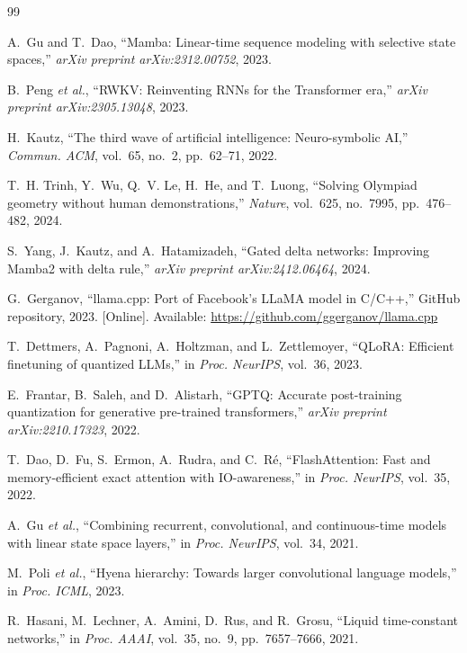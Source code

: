 \documentclass[journal]{IEEEtran}
\begin{document}
\begin{thebibliography}{99}

A.~Gu and T.~Dao, ``Mamba: Linear-time sequence modeling with selective state spaces,'' \textit{arXiv preprint arXiv:2312.00752}, 2023.

B.~Peng \textit{et al.}, ``RWKV: Reinventing RNNs for the Transformer era,'' \textit{arXiv preprint arXiv:2305.13048}, 2023.

H.~Kautz, ``The third wave of artificial intelligence: Neuro-symbolic AI,'' \textit{Commun. ACM}, vol.~65, no.~2, pp.~62--71, 2022.

T.~H. Trinh, Y.~Wu, Q.~V. Le, H.~He, and T.~Luong, ``Solving Olympiad geometry without human demonstrations,'' \textit{Nature}, vol.~625, no.~7995, pp.~476--482, 2024.

S.~Yang, J.~Kautz, and A.~Hatamizadeh, ``Gated delta networks: Improving Mamba2 with delta rule,'' \textit{arXiv preprint arXiv:2412.06464}, 2024.

G.~Gerganov, ``llama.cpp: Port of Facebook's LLaMA model in C/C++,'' GitHub repository, 2023. [Online]. Available: \url{https://github.com/ggerganov/llama.cpp}

T.~Dettmers, A.~Pagnoni, A.~Holtzman, and L.~Zettlemoyer, ``QLoRA: Efficient finetuning of quantized LLMs,'' in \textit{Proc. NeurIPS}, vol.~36, 2023.

E.~Frantar, B.~Saleh, and D.~Alistarh, ``GPTQ: Accurate post-training quantization for generative pre-trained transformers,'' \textit{arXiv preprint arXiv:2210.17323}, 2022.

T.~Dao, D.~Fu, S.~Ermon, A.~Rudra, and C.~R\'e, ``FlashAttention: Fast and memory-efficient exact attention with IO-awareness,'' in \textit{Proc. NeurIPS}, vol.~35, 2022.

A.~Gu \textit{et al.}, ``Combining recurrent, convolutional, and continuous-time models with linear state space layers,'' in \textit{Proc. NeurIPS}, vol.~34, 2021.

M.~Poli \textit{et al.}, ``Hyena hierarchy: Towards larger convolutional language models,'' in \textit{Proc. ICML}, 2023.

R.~Hasani, M.~Lechner, A.~Amini, D.~Rus, and R.~Grosu, ``Liquid time-constant networks,'' in \textit{Proc. AAAI}, vol.~35, no.~9, pp.~7657--7666, 2021.


\end{thebibliography}
\end{document}
